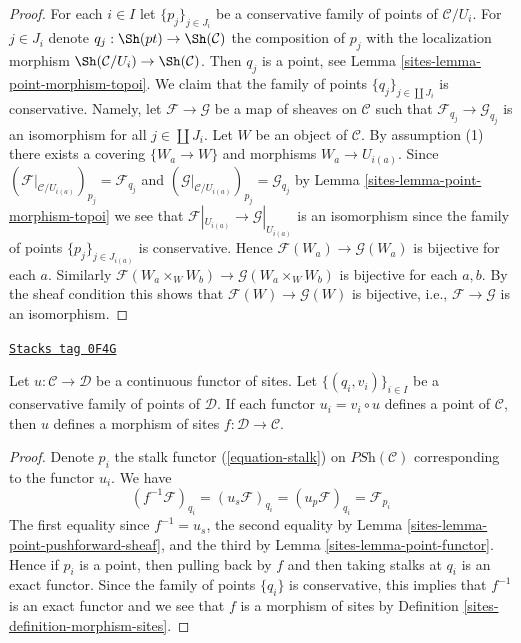 \begin{proof}

For each $i \in I$ let $\{p_j\}_{j \in J_i}$ be a conservative
family of points of $\mathcal{C}/U_i$. For $j \in J_i$ denote
$q_j : \Sh(pt) \to \Sh(\mathcal{C})$ the composition
of $p_j$ with the localization morphism
$\Sh(\mathcal{C}/U_i) \to \Sh(\mathcal{C})$.
Then $q_j$ is a point, see
Lemma \ref{sites-lemma-point-morphism-topoi}.
We claim that the family of points $\{q_j\}_{j \in \coprod J_i}$
is conservative.
Namely, let $\mathcal{F} \to \mathcal{G}$ be a map of sheaves
on $\mathcal{C}$ such that $\mathcal{F}_{q_j} \to \mathcal{G}_{q_j}$
is an isomorphism for all $j \in \coprod J_i$.
Let $W$ be an object of $\mathcal{C}$.
By assumption (1) there exists a covering $\{W_a \to W\}$ and
morphisms $W_a \to U_{i(a)}$.
Since $(\mathcal{F}|_{\mathcal{C}/U_{i(a)}})_{p_j} = \mathcal{F}_{q_j}$
and $(\mathcal{G}|_{\mathcal{C}/U_{i(a)}})_{p_j} = \mathcal{G}_{q_j}$ by
Lemma \ref{sites-lemma-point-morphism-topoi}
we see that
$\mathcal{F}|_{U_{i(a)}} \to \mathcal{G}|_{U_{i(a)}}$ is an isomorphism
since the family of points $\{p_j\}_{j \in J_{i(a)}}$ is conservative.
Hence $\mathcal{F}(W_a) \to \mathcal{G}(W_a)$ is bijective for each $a$.
Similarly $\mathcal{F}(W_a \times_W W_b) \to \mathcal{G}(W_a \times_W W_b)$
is bijective for each $a, b$.
By the sheaf condition this shows that
$\mathcal{F}(W) \to \mathcal{G}(W)$ is bijective, i.e.,
$\mathcal{F} \to \mathcal{G}$ is an isomorphism.
\end{proof}

\begin{lemma}
\label{sites-lemma-check-morphism-sites}
\href{https://stacks.math.columbia.edu/tag/0F4G}{\texttt{Stacks tag 0F4G}}

Let $u : \mathcal{C} \to \mathcal{D}$ be a continuous functor of sites.
Let $\{(q_i, v_i)\}_{i\in I}$ be a conservative family of points of
$\mathcal{D}$. If each functor $u_i = v_i \circ u$ defines
a point of $\mathcal{C}$,
then $u$ defines a morphism of sites $f : \mathcal{D} \to \mathcal{C}$.
\end{lemma}

\begin{proof}

Denote $p_i$ the stalk functor (\ref{equation-stalk}) on
$\textit{PSh}(\mathcal{C})$ corresponding to the functor $u_i$. We have
$$
(f^{-1}\mathcal{F})_{q_i} =
(u_s\mathcal{F})_{q_i} =
(u_p\mathcal{F})_{q_i} =
\mathcal{F}_{p_i}
$$
The first equality since $f^{-1} = u_s$, the second equality
by Lemma \ref{sites-lemma-point-pushforward-sheaf}, and the third
by Lemma \ref{sites-lemma-point-functor}.
Hence if $p_i$ is a point, then pulling back by $f$
and then taking stalks at $q_i$ is an exact functor.
Since the family of points $\{q_i\}$ is conservative, this
implies that $f^{-1}$ is an exact functor and we see
that $f$ is a morphism of sites by Definition \ref{sites-definition-morphism-sites}.
\end{proof}

